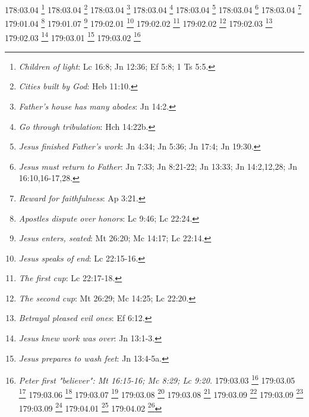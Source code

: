 {{{{{{{{{{{{{{{{{{{{{{{{{{{{{{{{{{{{{{{{{{{{{{{{{{{{{{{{{{{{{{{{{{{{{{{{178:03.04 \footnote{\textit{Children of light}: Lc 16:8; Jn 12:36; Ef 5:8; 1 Ts 5:5.}
178:03.04 \footnote{\textit{Cities built by God}: Heb 11:10.}
178:03.04 \footnote{\textit{Father's house has many abodes}: Jn 14:2.}
178:03.04 \footnote{\textit{Go through tribulation}: Hch 14:22b.}
178:03.04 \footnote{\textit{Jesus finished Father's work}: Jn 4:34; Jn 5:36; Jn 17:4; Jn 19:30.}
178:03.04 \footnote{\textit{Jesus must return to Father}: Jn 7:33; Jn 8:21-22; Jn 13:33; Jn 14:2,12,28; Jn 16:10,16-17,28.}
178:03.04 \footnote{\textit{Reward for faithfulness}: Ap 3:21.}
179:01.04 \footnote{\textit{Apostles dispute over honors}: Lc 9:46; Lc 22:24.}
179:01.07 \footnote{\textit{Jesus enters, seated}: Mt 26:20; Mc 14:17; Lc 22:14.}
179:02.01 \footnote{\textit{Jesus speaks of end}: Lc 22:15-16.}
179:02.02 \footnote{\textit{The first cup}: Lc 22:17-18.}
179:02.02 \footnote{\textit{The second cup}: Mt 26:29; Mc 14:25; Lc 22:20.}
179:02.03 \footnote{\textit{Betrayal pleased evil ones}: Ef 6:12.}
179:02.03 \footnote{\textit{Jesus knew work was over}: Jn 13:1-3.}
179:03.01 \footnote{\textit{Jesus prepares to wash feet}: Jn 13:4-5a.}
179:03.02 \footnote{\textit{Peter first "believer": Mt 16:15-16; Mc 8:29; Lc 9:20.}
179:03.03 \footnote{\textit{Peter objects to washing}: Jn 13:6-8a.}
179:03.05 \footnote{\textit{Peter agrees}: Jn 13:8b-9.}
179:03.06 \footnote{\textit{Washing Peter's feet}: Jn 13:10-11.}
179:03.07 \footnote{\textit{Washing Apostles' feet}: Jn 13:12a.}
179:03.08 \footnote{\textit{Discourse on master & servant}: Mt 10:24; Lc 22:27a; Jn 15:20.}
179:03.08 \footnote{\textit{Serve one another}: Jn 13:12b-17.}
179:03.09 \footnote{\textit{Importance of service}: Mc 10:42-45; Lc 22:25-27.}
179:03.09 \footnote{\textit{Jesus knew of dispute over honors}: Lc 22:24.}
179:03.09 \footnote{\textit{Reward for service}: Lc 22:28-30.}
179:04.01 \footnote{\textit{Announces pending betrayal}: Mt 26:21; Mc 14:18; Jn 13:21.}
179:04.02 \footnote{\textit{"Is it I?": Mt 26:22; Mc 14:19; Lc 22:23; Jn 13:22.}
179:04.02 \footnote{\textit{Betrayed by friend}: Mt 26:23; Mc 14:18b,20.}
179:04.02 \footnote{\textit{Traitor not necessary}: Mt 26:24; Mc 14:21; Lc 22:21-22.}
179:04.03 \footnote{\textit{Jesus gives "sop" to Judas}: Mt 26:25; Jn 13:25-26.}
179:04.04 \footnote{\textit{Peter asks John who is betrayer}: Jn 13:23-24.}
179:04.05 \footnote{\textit{Jesus reveals future}: Jn 13:19.}
179:04.06 \footnote{\textit{Jesus dismisses Judas}: Jn 13: 27b-30.}
179:05.01 \footnote{\textit{Cup of blessing}: Mt 26:27-29; Mc 14:23-25; Lc 22:20; 1 Co 11:25-26.}
179:05.03 \footnote{\textit{Bread of Life}: Mt 26:26; Mc 14:22; Lc 22:19; 1 Co 11:22b-24.}
}}}}}}}}}}}}}}}}}}}}}}}}}}}}}}}}}}}}}}}}}}}}}}}}}}}}}}}}}}}}}}}}}}}}}}}}}}

